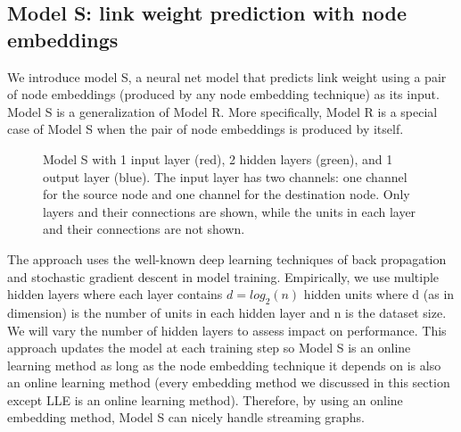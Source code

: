\documentclass{article} %
\begin{document}
\subsection{Model S: link weight prediction with node embeddings}
We introduce model S, a neural net model that predicts link weight using a pair of node embeddings (produced by any node embedding technique) as its input.
Model S is a generalization of Model R. More specifically, Model R is a special case of Model S when the pair of node embeddings is produced by itself.
\begin{figure}[h]\centering
	\newcommand{\layersep}{1cm}
	\caption{
		Model S with 1 input layer (red), 2 hidden layers (green), and 1 output layer (blue).
		The input layer has two channels: one channel for the source node and one channel for the destination node.
		Only layers and their connections are shown,
		while the units in each layer and their connections are not shown.
	}
	\label{fig:model-s}
\end{figure}

The approach uses the well-known deep learning techniques of back propagation \citep{rumelhart1988learning} and stochastic gradient descent \citep{lecun2012efficient} in model training.
Empirically, we use multiple hidden layers where each layer contains $ d = log_2(n) $ hidden units where d (as in dimension) is the number of units in each hidden layer and n is the dataset size.
We will vary the number of hidden layers to assess impact on performance.
This approach updates the model at each training step so Model S is an online learning method as long as the node embedding technique it depends on is also an online learning method (every embedding method we discussed in this section except LLE is an online learning method).
Therefore, by using an online embedding method, Model S can nicely handle streaming graphs.
\end{document}
